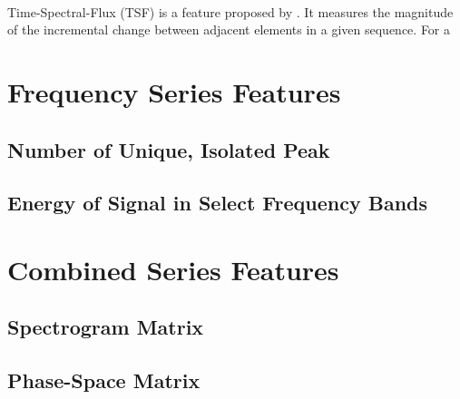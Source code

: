 \documentclass[12pt,letterpaper]{article}
\begin{document}
\paragraph*{}Time-Spectral-Flux (TSF) is a feature proposed by \cite{Kahn}. It measures the magnitude of the incremental change between adjacent elements in a given sequence. For a 





\section{Frequency Series Features}


\subsection{Number of Unique, Isolated Peak}


\subsection{Energy of Signal in Select Frequency Bands}





\section{Combined Series Features}


\subsection{Spectrogram Matrix}


\subsection{Phase-Space Matrix}

\end{document}
